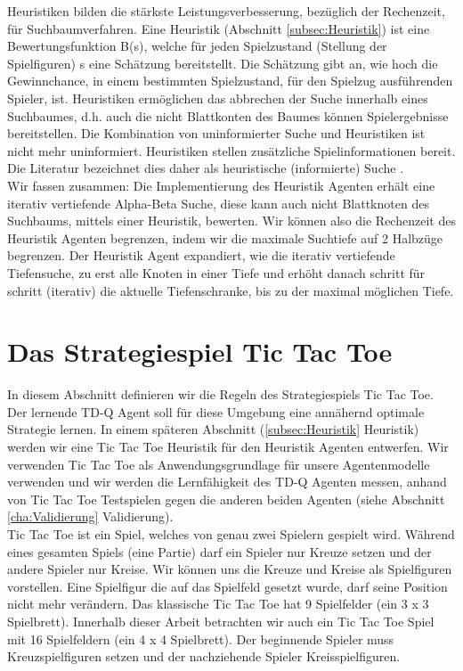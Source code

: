 Heuristiken bilden die stärkste Leistungsverbesserung, bezüglich der Rechenzeit, für Suchbaumverfahren. Eine Heuristik (Abschnitt \ref{subsec:Heuristik}) ist eine Bewertungsfunktion B(s), welche für jeden Spielzustand (Stellung der Spielfiguren) s eine Schätzung bereitstellt. Die Schätzung gibt an, wie hoch die Gewinnchance, in einem bestimmten Spielzustand, für den Spielzug ausführenden Spieler, ist. Heuristiken ermöglichen das abbrechen der Suche innerhalb eines Suchbaumes, d.h. auch die nicht Blattkonten des Baumes können Spielergebnisse bereitstellen. Die Kombination von uninformierter Suche und Heuristiken ist nicht mehr uninformiert. Heuristiken stellen zusätzliche Spielinformationen bereit. Die Literatur bezeichnet dies daher als heuristische (informierte) Suche \cite[105]{Ertel}. \\

Wir fassen zusammen: Die Implementierung des Heuristik Agenten erhält eine iterativ vertiefende Alpha-Beta Suche, diese kann auch nicht Blattknoten des Suchbaums, mittels einer Heuristik, bewerten. Wir können also die Rechenzeit des Heuristik Agenten begrenzen, indem wir die maximale Suchtiefe auf 2 Halbzüge begrenzen. Der Heuristik Agent expandiert, wie die iterativ vertiefende Tiefensuche, zu erst alle Knoten in einer Tiefe und erhöht danach schritt für schritt (iterativ) die aktuelle Tiefenschranke, bis zu der maximal möglichen Tiefe. 

\section{Das Strategiespiel Tic Tac Toe}
\label{sec:Das Strategiespiel Tic Tac Toe}

In diesem Abschnitt definieren wir die Regeln des Strategiespiels Tic Tac Toe. Der lernende TD-Q Agent soll für diese Umgebung eine annähernd optimale Strategie lernen. In einem späteren Abschnitt (\ref{subsec:Heuristik} Heuristik) werden wir eine Tic Tac Toe Heuristik für den Heuristik Agenten entwerfen. Wir verwenden Tic Tac Toe als Anwendungsgrundlage für unsere Agentenmodelle verwenden und wir werden die Lernfähigkeit des TD-Q Agenten messen, anhand von Tic Tac Toe Testspielen gegen die anderen beiden Agenten (siehe Abschnitt \ref{cha:Validierung} Validierung). \\
 
Tic Tac Toe ist ein Spiel, welches von genau zwei Spielern gespielt wird. Während eines gesamten Spiels (eine Partie) darf ein Spieler nur Kreuze setzen und der andere Spieler nur Kreise. Wir können uns die Kreuze und Kreise als Spielfiguren vorstellen. Eine Spielfigur die auf das Spielfeld gesetzt wurde, darf seine Position nicht mehr verändern. Das klassische Tic Tac Toe hat 9 Spielfelder (ein 3 x 3 Spielbrett). Innerhalb dieser Arbeit betrachten wir auch ein Tic Tac Toe Spiel mit 16 Spielfeldern (ein 4 x 4 Spielbrett). Der beginnende Spieler muss Kreuzspielfiguren setzen und der nachziehende Spieler Kreisspielfiguren. \\

